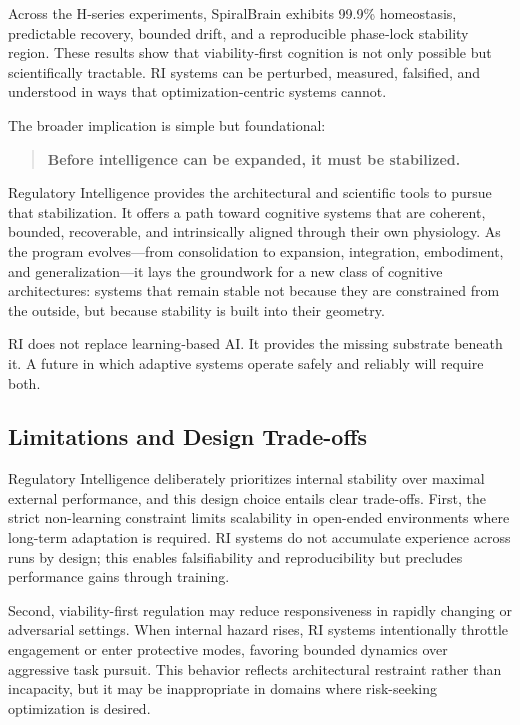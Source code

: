 \documentclass[12pt,a4paper]{report}
\begin{document}
Across the H‑series experiments, SpiralBrain exhibits 99.9\% homeostasis, predictable recovery, bounded drift, and a reproducible phase‑lock stability region. These results show that viability‑first cognition is not only possible but scientifically tractable. RI systems can be perturbed, measured, falsified, and understood in ways that optimization‑centric systems cannot.

The broader implication is simple but foundational:

\begin{quote}
\textbf{Before intelligence can be expanded, it must be stabilized.}
\end{quote}

Regulatory Intelligence provides the architectural and scientific tools to pursue that stabilization. It offers a path toward cognitive systems that are coherent, bounded, recoverable, and intrinsically aligned through their own physiology. As the program evolves—from consolidation to expansion, integration, embodiment, and generalization—it lays the groundwork for a new class of cognitive architectures: systems that remain stable not because they are constrained from the outside, but because stability is built into their geometry.

RI does not replace learning‑based AI. It provides the missing substrate beneath it.  
A future in which adaptive systems operate safely and reliably will require both.

\subsection{Limitations and Design Trade-offs}

Regulatory Intelligence deliberately prioritizes internal stability over maximal external performance, and this design choice entails clear trade-offs. First, the strict non-learning constraint limits scalability in open-ended environments where long-term adaptation is required. RI systems do not accumulate experience across runs by design; this enables falsifiability and reproducibility but precludes performance gains through training.

Second, viability-first regulation may reduce responsiveness in rapidly changing or adversarial settings. When internal hazard rises, RI systems intentionally throttle engagement or enter protective modes, favoring bounded dynamics over aggressive task pursuit. This behavior reflects architectural restraint rather than incapacity, but it may be inappropriate in domains where risk-seeking optimization is desired.
\end{document}
